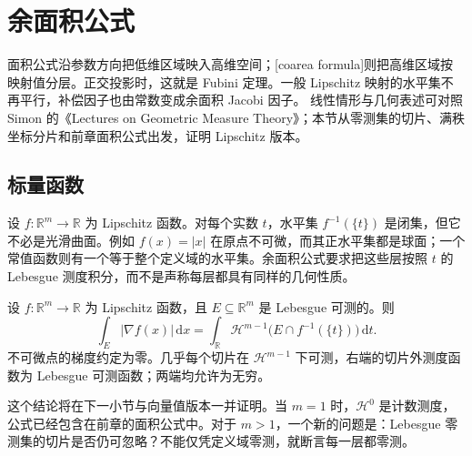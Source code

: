 \section{余面积公式}
\label{b1:sec:1802}

面积公式沿参数方向把低维区域映入高维空间；[coarea formula]则把高维区域按映射值分层。正交投影时，这就是 Fubini 定理。一般 Lipschitz 映射的水平集不再平行，补偿因子也由常数变成余面积 Jacobi 因子。
线性情形与几何表述可对照 Simon 的《Lectures on Geometric Measure Theory》\cite[\S10, pp. 53--57]{Simon1983Lectures}；本节从零测集的切片、满秩坐标分片和前章面积公式出发，证明 Lipschitz 版本。


\subsection{标量函数}
\label{b1:subsec:180201}

设 \(f:\mathbb R^m\rightarrow\mathbb R\) 为 Lipschitz 函数。对每个实数 \(t\)，水平集 \(f^{-1}(\{t\})\) 是闭集，但它不必是光滑曲面。例如 \(f(x)=|x|\) 在原点不可微，而其正水平集都是球面；一个常值函数则有一个等于整个定义域的水平集。余面积公式要求把这些层按照 \(t\) 的 Lebesgue 测度积分，而不是声称每层都具有同样的几何性质。

\begin{theorem}[标量余面积公式]\label{b1:thm:scalar-coarea}
设 \(f:\mathbb R^m\rightarrow\mathbb R\) 为 Lipschitz 函数，且 \(E\subseteq\mathbb R^m\) 是 Lebesgue 可测的。则
\[
 \int_E|\nabla f(x)|\,\mathrm dx
 =
 \int_{\mathbb R}\mathcal H^{m-1}
       \bigl(E\cap f^{-1}(\{t\})\bigr)\,\mathrm dt.
\]
不可微点的梯度约定为零。几乎每个切片在 \(\mathcal H^{m-1}\) 下可测，右端的切片外测度函数为 Lebesgue 可测函数；两端均允许为无穷。
\end{theorem}

这个结论将在下一小节与向量值版本一并证明。当 \(m=1\) 时，\(\mathcal H^0\) 是计数测度，公式已经包含在前章的面积公式中。对于 \(m>1\)，一个新的问题是：Lebesgue 零测集的切片是否仍可忽略？不能仅凭定义域零测，就断言每一层都零测。

